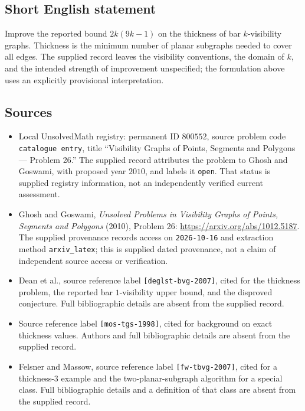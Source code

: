 \documentclass[11pt]{article}
\begin{document}
\subsection{Short English statement}
Improve the reported bound \(2k(9k-1)\) on the thickness of bar \(k\)-visibility graphs. Thickness is the minimum number of planar subgraphs needed to cover all edges. The supplied record leaves the visibility conventions, the domain of \(k\), and the intended strength of improvement unspecified; the formulation above uses an explicitly provisional interpretation.
\subsection{Sources}
\begin{itemize}
\item Local UnsolvedMath registry: permanent ID \(800552\), source problem code \texttt{catalogue entry}, title ``Visibility Graphs of Points, Segments and Polygons --- Problem 26.'' The supplied record attributes the problem to Ghosh and Goswami, with proposed year \(2010\), and labels it \texttt{open}. That status is supplied registry information, not an independently verified current assessment.
\item Ghosh and Goswami, \emph{Unsolved Problems in Visibility Graphs of Points, Segments and Polygons} (2010), Problem 26: \url{https://arxiv.org/abs/1012.5187}. The supplied provenance records access on \texttt{2026-10-16} and extraction method \texttt{arxiv\_latex}; this is supplied dated provenance, not a claim of independent source access or verification.
\item Dean et al., source reference label \texttt{[deglst-bvg-2007]}, cited for the thickness problem, the reported bar \(1\)-visibility upper bound, and the disproved conjecture. Full bibliographic details are absent from the supplied record.
\item Source reference label \texttt{[mos-tgs-1998]}, cited for background on exact thickness values. Authors and full bibliographic details are absent from the supplied record.
\item Felsner and Massow, source reference label \texttt{[fw-tbvg-2007]}, cited for a thickness-\(3\) example and the two-planar-subgraph algorithm for a special class. Full bibliographic details and a definition of that class are absent from the supplied record.
\end{itemize}
\end{document}
